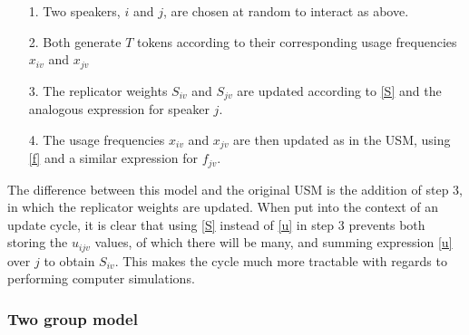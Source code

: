 \documentclass[12pt]{article}
\begin{document}
\begin{itemize}
\item[1.] Two speakers, $i$ and $j$, are chosen at random to interact as above.
\item[2.] Both generate $T$ tokens according to their corresponding usage frequencies $x_{iv}$ and $x_{jv}$
\item[3.] The replicator weights $S_{iv}$ and $S_{jv}$ are updated according to \eqref{S} and the analogous expression for speaker $j$.
\item[4.] The usage frequencies $x_{iv}$ and $x_{jv}$ are then updated as in the USM, using \eqref{f} and a similar expression for $f_{jv}$.
\end{itemize}
The difference between this model and the original USM is the addition of step 3, in which the replicator weights are updated. When put into the context of an update cycle, it is clear that using \eqref{S} instead of \eqref{u} in step 3 prevents both storing the $u_{ijv}$ values, of which there will be many, and summing expression \eqref{u} over $j$ to obtain $S_{iv}$. This makes the cycle much more tractable with regards to performing computer simulations.

\subsubsection{Two group model}
\end{document}
